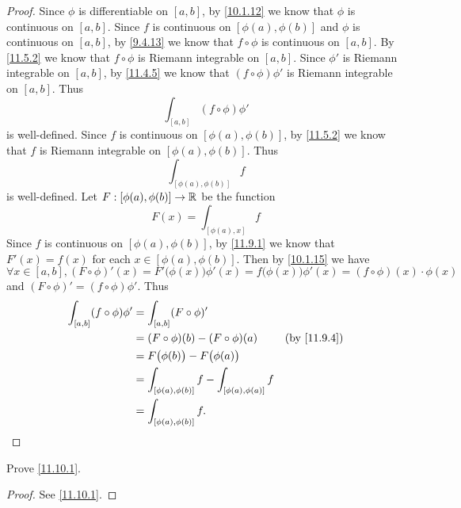 \begin{proof}
  Since \(\phi\) is differentiable on \([a, b]\), by \cref{10.1.12} we know that \(\phi\) is continuous on \([a, b]\).
  Since \(f\) is continuous on \([\phi(a), \phi(b)]\) and \(\phi\) is continuous on \([a, b]\), by \cref{9.4.13} we know that \(f \circ \phi\) is continuous on \([a, b]\).
  By \cref{11.5.2} we know that \(f \circ \phi\) is Riemann integrable on \([a, b]\).
  Since \(\phi'\) is Riemann integrable on \([a, b]\), by \cref{11.4.5} we know that \((f \circ \phi) \phi'\) is Riemann integrable on \([a, b]\).
  Thus
  \[
    \int_{[a, b]} (f \circ \phi) \phi'
  \]
  is well-defined.
  Since \(f\) is continuous on \([\phi(a), \phi(b)]\), by \cref{11.5.2} we know that \(f\) is Riemann integrable on \([\phi(a), \phi(b)]\).
  Thus
  \[
    \int_{[\phi(a), \phi(b)]} f
  \]
  is well-defined.
  Let \(F : [\phi(a), \phi(b)] \to \mathbb{R}\) be the function
  \[
    F(x) = \int_{[\phi(a), x]} f
  \]
  Since \(f\) is continuous on \([\phi(a), \phi(b)]\), by \cref{11.9.1} we know that \(F'(x) = f(x)\) for each \(x \in [\phi(a), \phi(b)]\).
  Then by \cref{10.1.15} we have
  \[
    \forall x \in [a, b], (F \circ \phi)'(x) = F'\big(\phi(x)\big) \phi'(x) = f\big(\phi(x)\big) \phi'(x) = (f \circ \phi)(x) \cdot \phi(x)
  \]
  and \((F \circ \phi)' = (f \circ \phi) \phi'\).
  Thus
  \begin{align*}
    \int_{[a, b]} (f \circ \phi) \phi' & = \int_{[a, b]} (F \circ \phi)'                                                         \\
                                       & = (F \circ \phi)(b) - (F \circ \phi)(a)                     & \text{(by \cref{11.9.4})} \\
                                       & = F\big(\phi(b)\big) - F\big(\phi(a)\big)                                               \\
                                       & = \int_{[\phi(a), \phi(b)]} f - \int_{[\phi(a), \phi(a)]} f                             \\
                                       & = \int_{[\phi(a), \phi(b)]} f.
  \end{align*}
\end{proof}

\exercisesection

\begin{ex}\label{ex:11.10.1}
  Prove \cref{11.10.1}.
\end{ex}

\begin{proof}
  See \cref{11.10.1}.
\end{proof}

